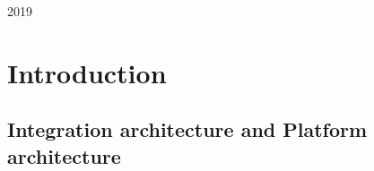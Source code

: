 \begin{titlepage}
 \vspace{0.5\baselineskip} %

 \textit{} %

 \vfill %



 \vspace{0.3\baselineskip} %

 2019 %

  {\large } %

\end{titlepage}


\newpage




\tableofcontents


\chapter{Introduction}

\section{Integration architecture and Platform architecture}

